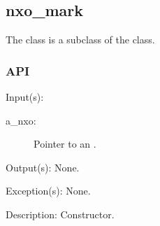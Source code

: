 %
%
%
%
%

\subsection{nxo\_mark}
\label{nxo_mark}

The  class is a subclass of the  class.

\subsubsection{API}
\begin{capi}
\label{nxo_mark_new}
	\begin{capilist}
	\item[Input(s): ]
		\begin{description}\item[]
		\item[a\_nxo: ]
			Pointer to an .
		\end{description}
	\item[Output(s): ] None.
	\item[Exception(s): ] None.
	\item[Description: ]
		Constructor.
	\end{capilist}
\end{capi}
